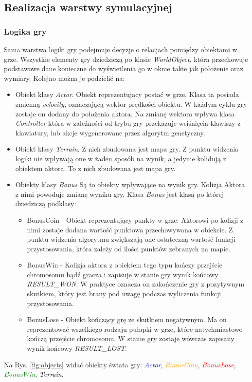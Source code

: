 \subsection{Realizacja warstwy symulacyjnej}
\subsubsection{Logika gry}
\begin{par}
	Sama warstwa logiki gry podejmuje decyzje o relacjach pomiędzy obiektami w grze.
	Wszystkie elementy gry dziedziczą po klasie \textit{WorldObject}, która przechowuje podstawowe dane konieczne do wyświetlenia go w oknie takie jak położenie oraz wymiary.
	Kolejno można je podzielić na:
	\begin{itemize}
		\item Obiekt klasy \textit{Actor}. 
		Obiekt reprezentujący postać w grze. 
		Klasa ta posiada zmienną \textit{velocity}, oznaczającą wektor prędkości obiektu.  
		W każdym cyklu gry zostaje on dodany do położenia aktora.
		Na zmianę wektora wpływa klasa \textit{Controller} która w zależności od trybu gry przekazuje wciśnięcia klawiszy z klawiatury, lub akcje wygenerowane przez algorytm genetyczny.
		\item Obiekt klasy \textit{Terrain}. Z nich zbudowana jest mapa gry. Z punktu widzenia logiki nie wpływają one w żaden sposób na wynik, a jedynie kolidują z obiektem aktora. To z nich zbudowana jest mapa gry.
		\item Obiekty klasy \textit{Bonus}
		Są to obiekty wpływające na wynik gry. Kolizja Aktora z nimi powoduje zmianę wyniku gry. Klasa \textit{Bonus} jest klasą po której dziedziczą podklasy:
		\begin{itemize}
			\item BonusCoin - Obiekt reprezentujący punkty w grze. Aktorowi po kolizji z nimi zostaje dodana wartość punktowa przechowywana w obiekcie. Z punktu widzenia algorytmu zwiększają one ostateczną wartość funkcji przystosowania, która zależy od ilości punktów zebranych na mapie.
			\item BonusWin - Kolizja aktora z obiektem tego typu kończy przejście chromosomu bądź gracza i zapisuje w stanie gry wynik końcowy \textit{RESULT\_WON}. W praktyce oznacza on zakończenie gry z pozytywnym skutkiem, który jest brany pod uwagę podczas wyliczenia funkcji przystosowania.
			\item BonusLose - Obiekt kończący grę ze skutkiem negatywnym. Ma on reprezentować wszelkiego rodzaju pułapki w grze, które natychmiastowo kończą przejście chromosomu. W stanie gry zostaje wówczas zapisany wynik końcowy \textit{RESULT\_LOST}.
		\end{itemize}
	\end{itemize}
	Na Rys. \ref{fig:objects} widać obiekty świata gry: 
	\textcolor{blue}{\textit{Actor}}, 
	\textcolor{orange}{\textit{BonusCoin}},
	\textcolor{red}{\textit{BonusLose}},
	\textcolor{green}{\textit{BonusWin}},
	\textcolor{black}{\textit{Terrain}}.


\end{par}
